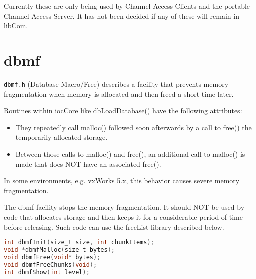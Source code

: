 Currently these are only being used by Channel Access Clients and the portable Channel Access Server.
It has not been decided if any of these will remain in libCom.

\section{dbmf}

\verb|dbmf.h| (Database Macro/Free) describes a facility that prevents memory fragmentation when memory is allocated and then freed a short time later.

Routines within iocCore like dbLoadDatabase() have the following attributes:

\begin{itemize}
\item They repeatedly call malloc() followed soon afterwards by a call to free() the temporarily allocated storage.

\item Between those calls to malloc() and free(), an additional call to malloc() is made that does NOT have an associated free().

\end{itemize}

In some environments, e.g. vxWorks 5.x, this behavior causes severe memory fragmentation.

The dbmf facility stops the memory fragmentation.
It should NOT be used by code that allocates storage and then keeps it for a considerable period of time before releasing.
Such code can use the freeList library described below.

\begin{lstlisting}[language=C]
int dbmfInit(size_t size, int chunkItems);
void *dbmfMalloc(size_t bytes);
void dbmfFree(void* bytes);
void dbmfFreeChunks(void);
int dbmfShow(int level);
\end{lstlisting}

